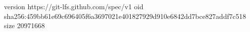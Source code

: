 version https://git-lfs.github.com/spec/v1
oid sha256:459bb61e69c696405f6a3697021e401827929d910e6842dd7bce827addf7c518
size 20971668
